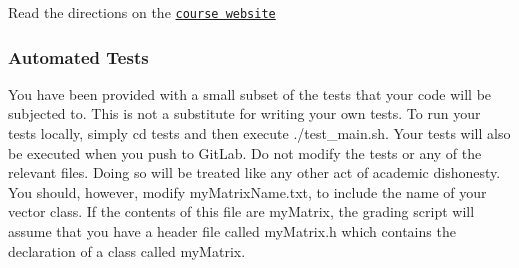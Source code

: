 Read the directions on the \href{https://jberm6.git-pages.mst.edu/essman/homework/hw5/}{\tt course website}

\subsubsection*{Automated Tests}

You have been provided with a small subset of the tests that your code will be subjected to. This is not a substitute for writing your own tests. To run your tests locally, simply {\ttfamily cd tests} and then execute {\ttfamily ./test\+\_\+main.sh}. Your tests will also be executed when you push to Git\+Lab. Do not modify the tests or any of the relevant files. Doing so will be treated like any other act of academic dishonesty. You should, however, modify {\ttfamily my\+Matrix\+Name.\+txt}, to include the name of your vector class. If the contents of this file are {\ttfamily my\+Matrix}, the grading script will assume that you have a header file called {\ttfamily my\+Matrix.\+h} which contains the declaration of a class called {\ttfamily my\+Matrix}. 
